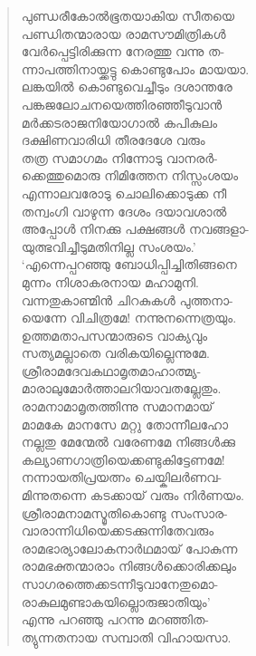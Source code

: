 \begin{verse}
പുണ്ഡരീകോല്‍ഭൂതയാകിയ സീതയെ\\
പണ്ഡിതന്മാരായ രാമസൗമിത്രികള്‍\\
വേര്‍പ്പെട്ടിരിക്കുന്ന നേരത്തു വന്നു ത-\\
ന്നാപത്തിനായ്ക്കട്ടു കൊണ്ടുപോം മായയാ.\\
ലങ്കയില്‍ കൊണ്ടുവെച്ചീടും ദശാന്തരേ\\
പങ്കജലോചനയെത്തിരഞ്ഞീടുവാന്‍\\
മര്‍ക്കടരാജനിയോഗാല്‍ കപികുലം\\
ദക്ഷിണവാരിധി തീരദേശേ വരും\\
തത്ര സമാഗമം നിന്നോടു വാനരര്‍-\\
ക്കെത്തുമൊരു നിമിത്തേന നിസ്സംശയം\\
എന്നാലവരോടു ചൊലിക്കൊടുക്ക നീ\\
തന്വംഗി വാഴുന്ന ദേശം ദയാവശാല്‍\\
അപ്പോള്‍ നിനക്കു പക്ഷങ്ങള്‍ നവങ്ങളാ-\\
യുത്ഭവിച്ചീടുമതിനില്ല സംശയം.’\\
‘എന്നെപ്പറഞ്ഞു ബോധിപ്പിച്ചിതിങ്ങനെ\\
മുന്നം നിശാകരനായ മഹാമുനി.\\
വന്നതുകാണ്മിന്‍ ചിറകുകള്‍ പുത്തനാ-\\
യെന്നേ വിചിത്രമേ! നന്നുനന്നെത്രയും.\\
ഉത്തമതാപസന്മാരുടെ വാക്യവും\\
സത്യമല്ലാതെ വരികയില്ലെന്നുമേ.\\
ശ്രീരാമദേവകഥാമൃതമാഹാത്മ്യ-\\
മാരാലുമോര്‍ത്താലറിയാവതല്ലേതും.\\
രാമനാമാമൃതത്തിന്നു സമാനമായ്\\
മാമകേ മാനസേ മറ്റു തോന്നീലഹോ\\
നല്ലതു മേന്മേല്‍ വരേണമേ നിങ്ങള്‍ക്കു\\
കല്യാണഗാത്രിയെക്കണ്ടുകിട്ടേണമേ!\\
നന്നായതിപ്രയത്നം ചെയ്കിലര്‍ണവ-\\
മിന്നുതന്നെ കടക്കായ് വരും നിര്‍ണയം.\\
ശ്രീരാമനാമസ്മൃതികൊണ്ടു സംസാര-\\
വാരാന്നിധിയെക്കടക്കുന്നിതേവരും\\
രാമഭാര്യാലോകനാര്‍ഥമായ് പോകുന്ന\\
രാമഭക്തന്മാരാം നിങ്ങള്‍ക്കൊരിക്കലും\\
സാഗരത്തെക്കടന്നീടുവാനേതുമൊ-\\
രാകുലമുണ്ടാകയില്ലൊരുജാതിയും’\\
എന്നു പറഞ്ഞു പറന്നു മറഞ്ഞിത-\\
ത്യുന്നതനായ സമ്പാതി വിഹായസാ.
\end{verse}

